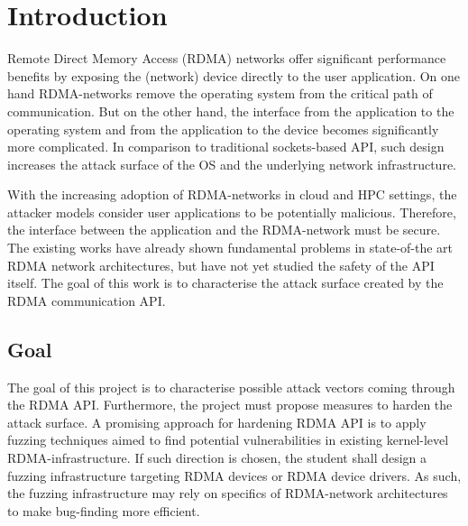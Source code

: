 \section{Introduction}



Remote Direct Memory Access (RDMA) networks offer significant performance benefits by exposing the (network) device directly
to the user application. On one hand RDMA-networks remove the operating system from the critical path of 
communication. But on the other hand, the interface from the application to the operating system and from 
the application to the device becomes significantly more complicated. In comparison to traditional sockets-based API, 
such design increases the attack surface of the OS and the underlying network infrastructure.

With the increasing adoption of RDMA-networks in cloud and HPC settings, the attacker models consider user applications 
to be potentially malicious. Therefore, the interface between the application and the RDMA-network must be secure.
The existing works have already shown fundamental problems in state-of-the art RDMA network architectures, but 
have not yet studied the safety of the API itself. The goal of this work is to characterise the attack surface 
created by the RDMA communication API.

\subsection{Goal}

The goal of this project is to characterise possible attack vectors coming through the RDMA API. Furthermore, the 
project must propose measures to harden the attack surface. A promising approach for hardening RDMA API is to apply 
fuzzing techniques aimed to find potential vulnerabilities in existing kernel-level RDMA-infrastructure. If such 
direction is chosen, the student shall design a fuzzing infrastructure targeting RDMA devices or RDMA device 
drivers. As such, the fuzzing infrastructure may rely on specifics of RDMA-network architectures to make bug-finding 
more efficient.